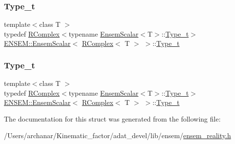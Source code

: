 \subsubsection{\texorpdfstring{Type\_t}{Type\_t}\hspace{0.1cm}{\footnotesize\ttfamily [1/2]}}
{\footnotesize\ttfamily template$<$class T $>$ \\
typedef \mbox{\hyperlink{classENSEM_1_1RComplex}{R\+Complex}}$<$typename \mbox{\hyperlink{structENSEM_1_1EnsemScalar}{Ensem\+Scalar}}$<$T$>$\+::\mbox{\hyperlink{structENSEM_1_1EnsemScalar_3_01RComplex_3_01T_01_4_01_4_abd854cbfbb45aac23836c31aa0a35076}{Type\+\_\+t}}$>$ \mbox{\hyperlink{structENSEM_1_1EnsemScalar}{E\+N\+S\+E\+M\+::\+Ensem\+Scalar}}$<$ \mbox{\hyperlink{classENSEM_1_1RComplex}{R\+Complex}}$<$ T $>$ $>$\+::\mbox{\hyperlink{structENSEM_1_1EnsemScalar_3_01RComplex_3_01T_01_4_01_4_abd854cbfbb45aac23836c31aa0a35076}{Type\+\_\+t}}}

\mbox{\label{structENSEM_1_1EnsemScalar_3_01RComplex_3_01T_01_4_01_4_abd854cbfbb45aac23836c31aa0a35076}} 
\subsubsection{\texorpdfstring{Type\_t}{Type\_t}\hspace{0.1cm}{\footnotesize\ttfamily [2/2]}}
{\footnotesize\ttfamily template$<$class T $>$ \\
typedef \mbox{\hyperlink{classENSEM_1_1RComplex}{R\+Complex}}$<$typename \mbox{\hyperlink{structENSEM_1_1EnsemScalar}{Ensem\+Scalar}}$<$T$>$\+::\mbox{\hyperlink{structENSEM_1_1EnsemScalar_3_01RComplex_3_01T_01_4_01_4_abd854cbfbb45aac23836c31aa0a35076}{Type\+\_\+t}}$>$ \mbox{\hyperlink{structENSEM_1_1EnsemScalar}{E\+N\+S\+E\+M\+::\+Ensem\+Scalar}}$<$ \mbox{\hyperlink{classENSEM_1_1RComplex}{R\+Complex}}$<$ T $>$ $>$\+::\mbox{\hyperlink{structENSEM_1_1EnsemScalar_3_01RComplex_3_01T_01_4_01_4_abd854cbfbb45aac23836c31aa0a35076}{Type\+\_\+t}}}



The documentation for this struct was generated from the following file\+:\begin{DoxyCompactItemize}
\item 
/\+Users/archanar/\+Kinematic\+\_\+factor/adat\+\_\+devel/lib/ensem/\mbox{\hyperlink{lib_2ensem_2ensem__reality_8h}{ensem\+\_\+reality.\+h}}\end{DoxyCompactItemize}
